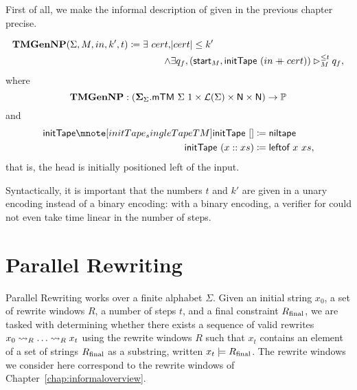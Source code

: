 First of all, we make the informal description of \gennp{} given in the previous chapter precise.
\begin{definition}[TMGenNP][SingleTMGenNP]\label{def:tmgennp}
  \begin{align*}
    \textbf{TMGenNP}{} (\Sigma, M,  in, k', t) \coloneqq \exists~cert, &|cert| \le k' \\
    \land &\exists q_f, ({\textsf{start}}_M, \textsf{initTape}~(in \mathbin{+\mkern-10mu+} cert)) \rhd_M^{\le t} q_f, 
  \end{align*}
  where 
  \[\textbf{TMGenNP}{} : (\bm{\Sigma}_{{\Sigma}}. \textsf{mTM}~\Sigma~1 \times \mathcal{L} (\Sigma) \times \mathsf{N} \times \mathsf{N}) \rightarrow \mathbb{P} \]
  and 
  \begin{align*}
    \mnotec[initTape_singleTapeTM]{\textsf{initTape}}~[] &\defeq \textsf{niltape} \\
    \textsf{initTape}~(x::xs) &\defeq \textsf{leftof}~x~xs,
  \end{align*}
  that is, the head is initially positioned left of the input.
\end{definition}

Syntactically, it is important that the numbers $t$ and $k'$ are given in a unary encoding instead of a binary encoding: with a binary encoding, a verifier for \gennp{} could not even take time linear in the number of steps. 

\section{Parallel Rewriting}\label{sec:pr}
Parallel Rewriting works over a finite alphabet $\Sigma$. Given an initial string $x_0$, a set of rewrite windows $R$, a number of steps $t$, and a final constraint $R_{\text{final}}$, we are tasked with determining whether there exists a sequence of valid rewrites $x_0 \rightsquigarrow_{R} \ldots \rightsquigarrow_{R} x_t$ using the rewrite windows $R$ such that $x_t$ contains an element of a set of strings $R_{\text{final}}$ as a substring, written $x_t \models R_{\text{final}}$. The rewrite windows we consider here correspond to the rewrite windows of Chapter~\ref{chap:informaloverview}.


